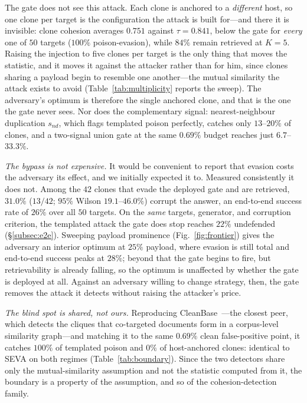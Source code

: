 \documentclass[10pt,journal,compsoc]{IEEEtran}
\begin{document}
The gate does not see this attack. Each clone is anchored to a \emph{different} host, so
one clone per target is the configuration the attack is built for---and there it is invisible:
clone cohesion averages $0.751$ against $\tau=0.841$, below the gate for \emph{every} one of
$50$ targets ($100\%$ poison-evasion), while $84\%$ remain retrieved at $K=5$. Raising the
injection to five clones per target is the only thing that moves the statistic, and it moves it
against the attacker rather than for him, since clones sharing a payload begin to resemble one
another---the mutual similarity the attack exists to avoid (Table~\ref{tab:multiplicity} reports the
sweep). The adversary's optimum is therefore the single anchored clone, and that is the one the
gate never sees. Nor does the complementary signal: nearest-neighbour
duplication $s_{nd}$, which flags templated poison perfectly, catches only $13$--$20\%$ of
clones, and a two-signal union gate at the same $0.69\%$ budget reaches just $6.7$--$33.3\%$.

\emph{The bypass is not expensive.} It would be convenient to report that evasion costs the
adversary its effect, and we initially expected it to. Measured consistently it does not. Among
the $42$ clones that evade the deployed gate and are retrieved, $31.0\%$ ($13/42$; $95\%$ Wilson
$19.1$--$46.0\%$) corrupt the answer, an end-to-end success rate of $26\%$ over all $50$
targets. On the \emph{same} targets, generator, and corruption criterion, the templated attack
the gate does stop reaches $22\%$ undefended (\S\ref{subsec:e2e}). Sweeping payload
prominence (Fig.~\ref{fig:frontier}) gives the adversary an interior optimum at $25\%$ payload,
where evasion is still total and end-to-end success peaks at $28\%$; beyond that the gate begins
to fire, but retrievability is already falling, so the optimum is unaffected by whether the gate
is deployed at all. Against an adversary willing to change strategy, then, the gate removes
the attack it detects without raising the attacker's price.

\emph{The blind spot is shared, not ours.} Reproducing CleanBase~\cite{cleanbase}---the closest
peer, which detects the cliques that co-targeted documents form in a corpus-level similarity
graph---and matching it to the same $0.69\%$ clean false-positive point, it catches $100\%$ of
templated poison and $0\%$ of host-anchored clones: identical to SEVA on both regimes
(Table~\ref{tab:boundary}). Since the two detectors share only the mutual-similarity assumption
and not the statistic computed from it, the boundary is a property of the assumption, and so of
the cohesion-detection family.
\end{document}
